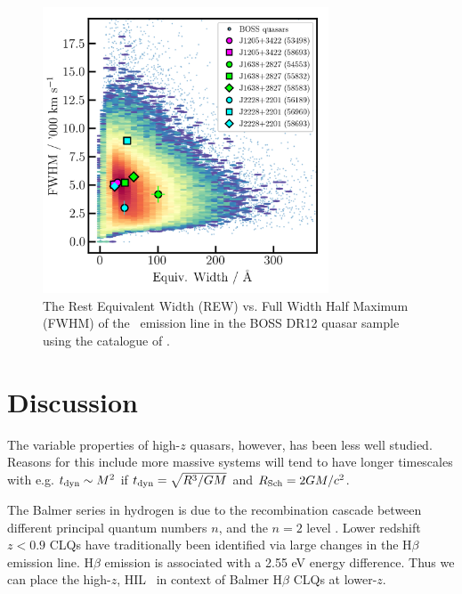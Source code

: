 \documentclass[a4paper,fleqn,usenatbib]{mnras}
\begin{document}
\begin{figure}
  \centering
  \includegraphics[width=8.5cm, trim=0.2cm 0.2cm 0.0cm 0.2cm, clip]
  {figures/CIV_CLQs_REWvsFWHM_20191029.png}
   \vspace{-12pt}
  \caption[]{The Rest Equivalent Width (REW) vs. Full Width Half Maximum (FWHM) 
of the \civ\ emission line in the BOSS DR12 quasar sample using the catalogue 
of \citet{Hamann2017}. %
}
  \label{fig:REWvsFWHM}
\end{figure}
\section{Discussion}
The variable properties of high-$z$
quasars, however, has been less well studied. Reasons for this include
more massive systems will tend to have longer timescales with e.g.
$t_{\rm dyn}  \sim M^{2}$ if $t_{\rm dyn} = \sqrt{ R^{3}/GM}$ and $R_{\rm Sch}= 2GM /c^{2}$.

The Balmer series in hydrogen is due to the recombination cascade
between different principal quantum numbers $n$, and
the $n=2$ level \citep[e.g., ][]{Seaton1959a, Seaton1959b}. 
Lower redshift $z<0.9$ CLQs have traditionally been identified via large changes in the
H$\beta$ emission line. H$\beta$ emission is associated with a 2.55 eV energy difference. 
Thus we can place the high-$z$, HIL \civ\ in context of Balmer H$\beta$ CLQs at lower-$z$.
\end{document}
